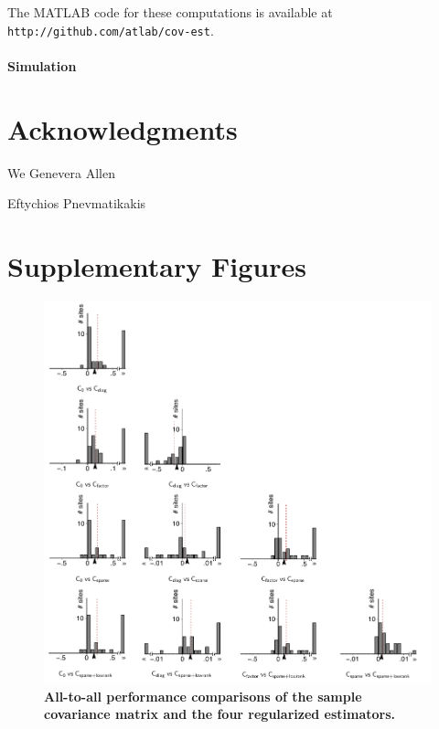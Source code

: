 \documentclass[10pt]{article}
\begin{document}
The MATLAB code for these computations is available at {\tt http://github.com/atlab/cov-est}.


\paragraph{Simulation}

\section*{Acknowledgments}
We Genevera Allen

Eftychios Pnevmatikakis 




\newpage
\section*{Supplementary Figures}
\setcounter{figure}{0}
\begin{figure}[!ht]
\begin{center}
\includegraphics{./figures/Figure-Supp01.pdf}
\end{center}
\caption{{\bf All-to-all performance comparisons of the sample covariance matrix and the four regularized estimators.}
}
\label{supp:01}
\end{figure}
\end{document}

